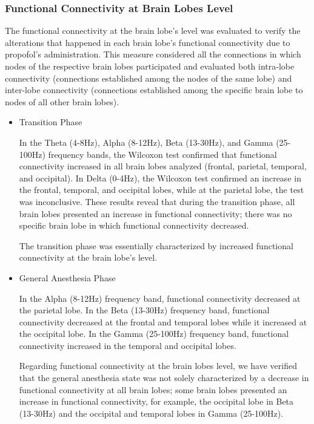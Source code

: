 \documentclass[twoside]{article}
\begin{document}
\begin{multicols}{2}




\subsubsection{Functional Connectivity at Brain Lobes Level}

The functional connectivity at the brain lobe's level was evaluated to verify the alterations that happened in each brain lobe's functional connectivity due to propofol's administration. This measure considered all the connections in which nodes of the respective brain lobes participated and evaluated both intra-lobe connectivity (connections established among the nodes of the same lobe) and inter-lobe connectivity (connections established among the specific brain lobe to nodes of all other brain lobes).


\begin{itemize}

\item Transition Phase

In the Theta (4-8Hz), Alpha (8-12Hz), Beta (13-30Hz), and Gamma (25-100Hz) frequency bands, the Wilcoxon test confirmed that functional connectivity increased in all brain lobes analyzed (frontal, parietal, temporal, and occipital). In Delta (0-4Hz), the Wilcoxon test confirmed an increase in the frontal, temporal, and occipital lobes, while at the parietal lobe, the test was inconclusive.
These results reveal that during the transition phase, all brain lobes presented an increase in functional connectivity; there was no specific brain lobe in which functional connectivity decreased. 

The transition phase was essentially characterized by increased functional connectivity at the brain lobe's level.



\item General Anesthesia Phase

In the Alpha (8-12Hz) frequency band, functional connectivity decreased at the parietal lobe.
In the Beta (13-30Hz) frequency band, functional connectivity decreased at the frontal and temporal lobes while it increased at the occipital lobe.
In the Gamma (25-100Hz) frequency band, functional connectivity increased in the temporal and occipital lobes. 

Regarding functional connectivity at the brain lobes level, we have verified that the general anesthesia state was not solely characterized by a decrease in functional connectivity at all brain lobes; some brain lobes presented an increase in functional connectivity, for example, the occipital lobe in Beta (13-30Hz) and the occipital and temporal lobes in Gamma (25-100Hz).

\end{itemize}



\end{multicols}
\end{document}
